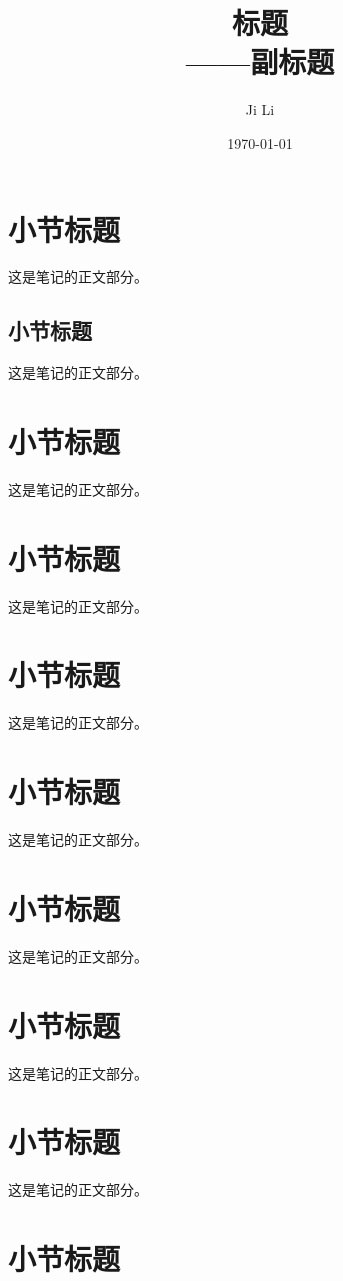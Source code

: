 \documentclass[12pt, a4paper, oneside, UTF8]{ctexart}
\title{{\Huge{\textbf{标题}}}\\——副标题}
\author{Ji Li}
\date{\today}
\begin{document}
\maketitle

\section{小节标题}

这是笔记的正文部分。
\subsection{小节标题}

这是笔记的正文部分。
\section{小节标题}

这是笔记的正文部分。
\section{小节标题}

这是笔记的正文部分。
\section{小节标题}

这是笔记的正文部分。
\section{小节标题}

这是笔记的正文部分。
\section{小节标题}

这是笔记的正文部分。
\section{小节标题}

这是笔记的正文部分。
\section{小节标题}

这是笔记的正文部分。

\section{小节标题}
\end{document}
